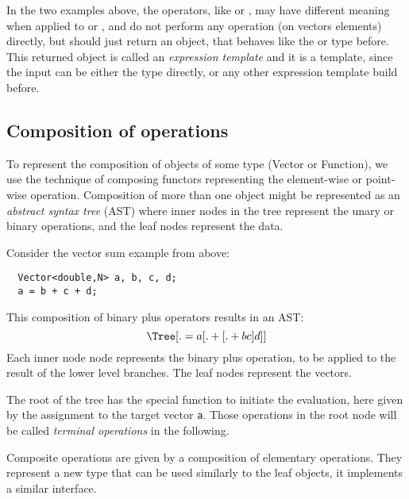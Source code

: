 In the two examples above, the operators, like  or , may have different meaning when applied to  or ,
and do not perform any operation (on vectors elements) directly, but should just return an object, that behaves like the  or  type
before. This returned object is called an \emph{expression template} and it is a template, since the input can be either the  type directly, or
any other expression template build before.


\subsection{Composition of operations}
To represent the composition of objects of some type (\eg Vector or Function), we use the technique of composing functors representing the
element-wise or point-wise operation. Composition of more than one object might be represented as an \emph{abstract syntax tree} (AST) where
inner nodes in the tree represent the unary or binary operations, and the leaf nodes represent the data.

\begin{example}
  Consider the vector sum example from above:
  \begin{verbatim}
  Vector<double,N> a, b, c, d;
  a = b + c + d;
  \end{verbatim}
  This composition of binary plus operators results in an AST:
  \begin{equation}
  \Tree [.= a [.+ [.+ b c ] d ] ]
  \end{equation}
  Each inner node node represents the binary plus operation, to be applied to the result of the lower level branches. The leaf nodes represent the vectors.

  The root of the tree has the special function to initiate the evaluation, here given by the assignment to the target vector \texttt{a}.
  Those operations in the root node will be called \emph{terminal operations} in the following.
\end{example}

Composite operations are given by a composition of elementary operations. They represent a new type that can be used similarly to the leaf objects, \ie
it implements a similar interface.


